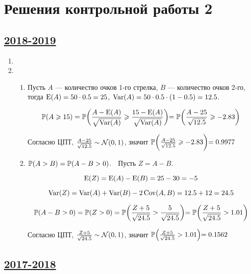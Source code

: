 \thispagestyle{empty}
\section{Решения контрольной работы 2}

\subsection[2018-2019]{\hyperref[sec:kr_02_2018_2019]{2018-2019}}
\label{sec:sol_kr_02_2018_2019}

\begin{enumerate}
\item

\item
\begin{enumerate}
    \item Пусть $A$ — количество очков 1-го стрелка, $B$ — количество очков 2-го, тогда $\E(A) = 50 \cdot 0.5 = 25$, $\Var(A) = 50 \cdot 0.5 \cdot (1 - 0.5) = 12.5$.
        
    \[\P(A \ge 15) = \P\biggl(\frac{A - \E(A)}{\sqrt{\Var(A)}} \ge \frac{15 - \E(A)}{\sqrt{\Var(A)}}\biggl) 
    = \P\biggl(\frac{A - 25}{\sqrt{12.5}} \ge -2.83\biggl)\]
    
    Согласно ЦПТ, $\frac{A - 25}{\sqrt{12.5}} \sim \cN(0, 1)$, значит $\P\biggl(\frac{A - 25}{\sqrt{12.5}} \ge -2.83\biggl) = 0.9977$
    
    \item $\P(A > B) = \P(A - B > 0)$.~~Пусть $Z = A - B$.
    
    \[\E(Z) = \E(A) - \E(B) = 25 - 30 = -5\] 
    
    \[\Var(Z) = \Var(A) + \Var(B) - 2\cov(A, B) = 12.5 + 12 = 24.5\] 
    
    \[\P(A - B > 0) = \P(Z > 0) = \P\biggl(\frac{Z + 5}{\sqrt{24.5}} > \frac{5}{\sqrt{24.5}}\biggl) = \P\biggl(\frac{Z + 5}{\sqrt{24.5}} > 1.01\biggl)\]
    
    Согласно ЦПТ, $\frac{Z + 5}{\sqrt{24.5}} \sim \cN(0, 1)$, значит $\P\Bigl(\frac{Z + 5}{\sqrt{24.5}} > 1.01\Bigl) = 0.1562$
\end{enumerate}

\end{enumerate}

\subsection[2017-2018]{\hyperref[sec:kr_02_2017_2018]{2017-2018}}
\label{sec:sol_kr_02_2017_2018}

